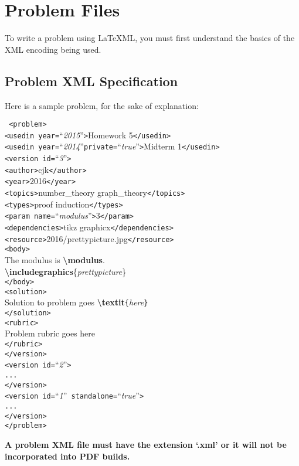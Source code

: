 \section{Problem Files}
  To write a problem using \LaTeX ML, you must first understand the basics 
  of the XML encoding being used.
  
  \subsection{Problem XML Specification}
    Here is a sample problem, for the sake of explanation:
{
  \newcommand\TB{\hspace*{1em}}
    \begin{mdframed}
      \texttt{
<problem>\\
\TB<usedin year=}``\textit{2015}''\texttt{>}Homework 5\texttt{</usedin>\\
\TB<usedin year=}``\textit{2014}''\texttt{private=}``\textit{true}''\texttt{>}Midterm 1\texttt{</usedin>\\
\TB<version id=}``\textit{3}''\texttt{>\\
\TB\TB<author>}cjk\texttt{</author>\\
\TB\TB<year>}2016\texttt{</year>\\
\TB\TB<topics>}number\_theory graph\_theory\texttt{</topics>\\
\TB\TB<types>}proof induction\texttt{</types>\\
\TB\TB<param name=}``\textit{modulus}''\texttt{>}3\texttt{</param>\\
\TB\TB<dependencies>}tikz graphicx\texttt{</dependencies>\\
\TB\TB<resource>}2016/prettypicture.jpg\texttt{</resource>\\
\TB\TB<body>}\\
\TB\TB\TB The modulus is \textbf{\textbackslash modulus}.\\
\TB\TB\TB \textbf{\textbackslash includegraphics}\{\textit{prettypicture}\}\\
\TB\TB\texttt{</body>\\
\TB\TB<solution>}\\
\TB\TB\TB Solution to problem goes 
  \textbf{\textbackslash textit}\texttt{\{}\textit{here}\texttt{\}}\\
\TB\TB\texttt{</solution>\\
\TB\TB<rubric>\\
\TB\TB\TB}Problem rubric goes here\texttt{\\
\TB\TB</rubric>\\
\TB</version>\\
\TB<version id=}``\textit{2}''\texttt{>\\
\TB\TB...\\
\TB</version>\\
\TB<version id=}``\textit{1}''\texttt{ standalone=}``\textit{true}''\texttt{>\\
\TB\TB...\\
\TB</version>\\
</problem>
}
    \end{mdframed}
}
    \textbf{A problem XML file must have the extension `.xml' or it will 
    not be incorporated into PDF builds.}
    
